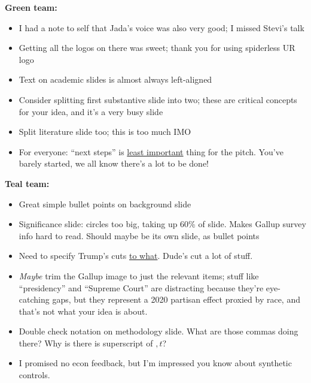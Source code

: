 \documentclass[12pt,pdftex,letterpaper]{article}
\begin{document}
\noindent \textbf{Green team:}
\begin{itemize}
	\item I had a note to self that Jada's voice was also very good; I missed Stevi's talk
	
	\item Getting all the logos on there was sweet; thank you for using spiderless UR logo
	
	\item Text on academic slides is almost always left-aligned
	
	\item Consider splitting first substantive slide into two; these are critical concepts for your idea, and it's a very busy slide
	
	\item Split literature slide too; this is too much IMO
	
	\item For everyone: ``next steps'' is \underline{least important} thing for the pitch. You've barely started, we all know there's a lot to be done!
\end{itemize}


\vspace{0.5cm}

\noindent \textbf{Teal team:}
\begin{itemize}
	\item Great simple bullet points on background slide
	
	\item Significance slide: circles too big, taking up 60\% of slide. Makes Gallup survey info hard to read. Should maybe be its own slide, as bullet points
	
	\item Need to specify Trump's cuts \underline{to what}. Dude's cut a lot of stuff.
	
	\item \textit{Maybe} trim the Gallup image to just the relevant items; stuff like ``presidency'' and ``Supreme Court'' are distracting because they're eye-catching gaps, but they represent a 2020 partisan effect proxied by race, and that's not what your idea is about.
	
	\item Double check notation on methodology slide. What are those commas doing there? Why is there is superscript of $,t$?
	
	\item I promised no econ feedback, but I'm impressed you know about synthetic controls.
\end{itemize}
\end{document}
